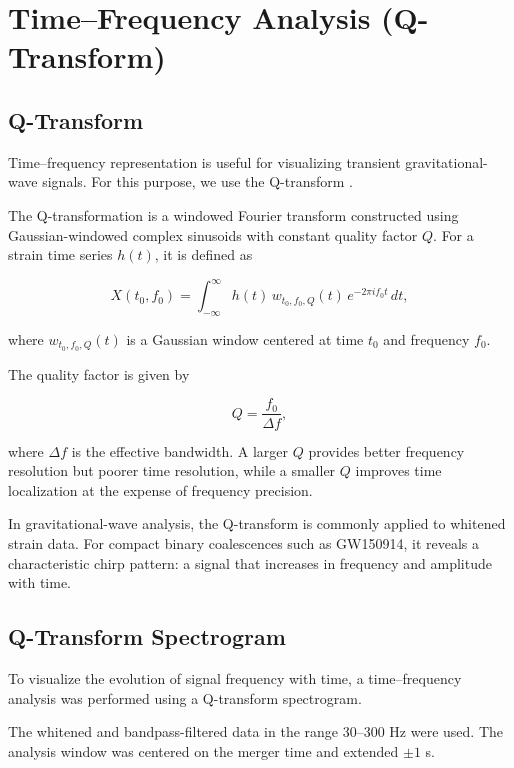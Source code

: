 \section{Time–Frequency Analysis (Q-Transform)} \label{sec:5}

\subsection{Q-Transform}
Time–frequency representation is useful
for visualizing transient gravitational-wave signals. For this purpose,
we use the Q-transform \cite{Chatterji2004,Chatterji2005}.

The Q-transformation is a windowed Fourier transform constructed using
Gaussian-windowed complex sinusoids with constant quality factor \( Q \).
For a strain time series \( h(t) \), it is defined as

\begin{equation}
	X(t_0, f_0) =
	\int_{-\infty}^{\infty}
	h(t)\,
	w_{t_0,f_0,Q}(t)\,
	e^{-2\pi i f_0 t}\, dt ,
\end{equation}

where \( w_{t_0,f_0,Q}(t) \) is a Gaussian window centered at time
\( t_0 \) and frequency \( f_0 \).

The quality factor is given by

\begin{equation}
	Q = \frac{f_0}{\Delta f},
\end{equation}

where \( \Delta f \) is the effective bandwidth. A larger \( Q \)
provides better frequency resolution but poorer time resolution,
while a smaller \( Q \) improves time localization at the expense
of frequency precision.

In gravitational-wave analysis, the Q-transform is commonly applied
to whitened strain data. For compact binary coalescences such as
GW150914, it reveals a characteristic chirp pattern: a signal
that increases in frequency and amplitude with time.

\subsection{Q-Transform Spectrogram}
To visualize the evolution of signal frequency with time, a time--frequency analysis was performed using a Q-transform spectrogram. 

The whitened and bandpass-filtered data in the range 30--300 Hz were used. The analysis window was centered on the merger time and extended $\pm 1$ s.


